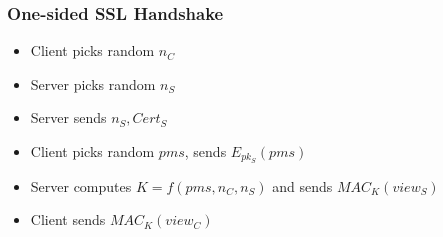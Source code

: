                 \begin{frame} 
                    \frametitle{One-sided SSL Handshake}
                        \begin{itemize}
                            \item Client picks random $n_C$
                            \item Server picks random $n_S$
                            \item Server sends $n_S, Cert_S$
                            \item Client picks random $pms$, sends $E_{pk_S}(pms)$
                            \item Server computes $K = f(pms, n_C, n_S)$ and sends $MAC_K(view_S)$
                            \item Client sends $MAC_K(view_C)$
                        \end{itemize}
                \end{frame}

